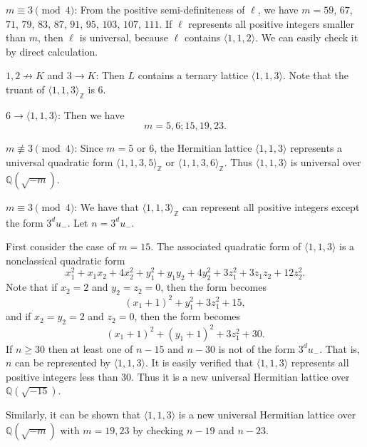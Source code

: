 \documentclass[a4paper,10pt,reqno]{amsart}
\begin{document}
{} $m \equiv 3 \pmod{4}$: From the positive semi-definiteness of $\ell$, we have $m =
59$, $67$, $71$, $79$, $83$, $87$, $91$, $95$, $103$, $107$, $111$. If $\ell$ represents all
positive integers smaller than $m$, then $\ell$ is universal, because $\ell$ contains ${\langle {1,1,2} \rangle}$.
We can easily check it by direct calculation.

{} $1, 2 \not\to K$ and $3 \to K$: Then $L$ contains a ternary lattice ${\langle {1,1,3} \rangle}$. Note
that the truant of ${\langle {1,1,3} \rangle}_{\mathbb{Z}}$ is 6.

{} $6 \to {\langle {1,1,3} \rangle}$: Then we have
\[
    m = 5, 6; 15, 19, 23.
\]

{} $m {\not\equiv} 3 \pmod{4}$: Since $m = 5$ or $6$, the Hermitian lattice ${\langle {1,1,3} \rangle}$
represents a universal quadratic form ${\langle {1,1,3,5} \rangle}_{\mathbb{Z}}$ or ${\langle {1,1,3,6} \rangle}_{\mathbb{Z}}$. Thus ${\langle {1,1,3} \rangle}$ is
universal over ${\mathbb{Q}(\sqrt{{-m}})}$.

{} $m \equiv 3 \pmod{4}$: We have that ${\langle {1,1,3} \rangle}_{\mathbb{Z}}$ can represent all positive
integers except the form $3^{d} u_{-}$. Let $n=3^{d}u_{-}$.

First consider the case of $m=15$. The associated quadratic form
of ${\langle {1,1,3} \rangle}$ is a nonclassical quadratic form
\[
    x_1^2 + x_1x_2 + 4x_2^2 + y_1^2 + y_1y_2 + 4y_2^2 + 3z_1^2+3z_1z_2+12z_2^2.
\]
Note that if $x_2 = 2$ and $y_2 = z_2 = 0$, then the form becomes
\[
    (x_1+1)^2 + y_1^2 + 3z_1^2 + 15,
\]
and if $x_2 = y_2 = 2$ and $z_2 = 0$, then the form becomes
\[
    (x_1+1)^2 + (y_1+1)^2 + 3z_1^2 + 30.
\]
If $n \ge 30$ then at least one of  $n-15$ and $n-30$ is not of the form $3^{d}u_{-}$. That is, $n$
can be represented by ${\langle {1,1,3} \rangle}$. It is easily verified that ${\langle {1,1,3} \rangle}$ represents all positive
integers less than $30$. Thus it is a new universal Hermitian lattice over ${\mathbb{Q}(\sqrt{{-15}})}$.

Similarly, it can be shown that ${\langle {1,1,3} \rangle}$ is a new universal Hermitian lattice over ${\mathbb{Q}(\sqrt{{-m}})}$
with $m = 19, 23$ by checking $n-19$ and $n-23$.
\end{document}
